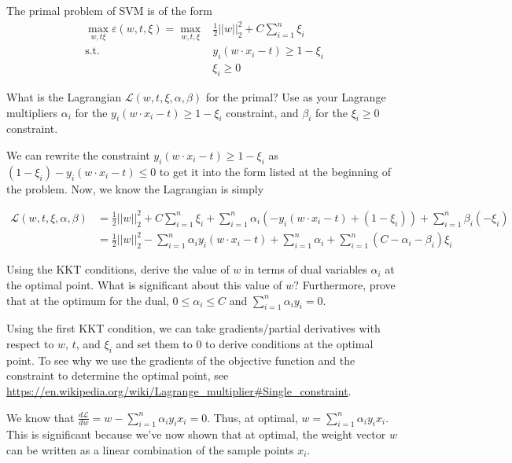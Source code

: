 \begin{Parts}
\Part
The primal problem of SVM is of the form
\begin{align*}
\max_{w, t \xi} \varepsilon(w, t, \xi) = \max_{w, t, \xi} & \frac{1}{2} ||w||_2^2 + C \sum_{i=1}^n \xi_i\\
\text{s.t. } &y_i(w \cdot x_i - t) \geq 1 - \xi_i\\
& \xi_i \geq 0
\end{align*}

What is the Lagrangian $\mathcal{L}(w, t, \xi, \alpha, \beta)$ for the primal? Use as your Lagrange multipliers $\alpha_i$ for the $y_i(w \cdot x_i - t) \geq 1 - \xi_i$ constraint, and $\beta_i$ for the $\xi_i \geq 0$ constraint.

\begin{solution}
We can rewrite the constraint $y_i(w \cdot x_i - t) \geq 1 - \xi_i$ as $(1 - \xi_i) - y_i(w \cdot x_i - t) \leq 0$ to get it into the form listed at the beginning of the problem. Now, we know the Lagrangian is simply

\begin{align*}
\mathcal{L}(w, t, \xi, \alpha, \beta) &= \frac{1}{2} ||w||_2^2 + C \sum_{i=1}^n \xi_i + \sum_{i=1}^n \alpha_i(-y_i(w \cdot x_i - t) + (1 - \xi_i)) + \sum_{i=1}^n \beta_i (-\xi_i) \\
&= \frac{1}{2} ||w||_2^2 - \sum_{i=1}^n \alpha_iy_i(w \cdot x_i - t)  + \sum_{i=1}^n \alpha_i + \sum_{i=1}^n (C - \alpha_i - \beta_i) \xi_i
\end{align*}
\end{solution}

\Part
Using the KKT conditions, derive the value of $w$ in terms of dual variables $\alpha_i$ at the optimal point. What is significant about this value of $w$? Furthermore, prove that at the optimum for the dual, $0 \leq \alpha_i \leq C$ and $\sum_{i=1}^n \alpha_i y_i = 0$.

\begin{solution}
Using the first KKT condition, we can take gradients/partial derivatives with respect to $w$, $t$, and $\xi_i$ and set them to 0 to derive conditions at the optimal point.
To see why we use the gradients of the objective function and the constraint to determine the optimal point, see \url{https://en.wikipedia.org/wiki/Lagrange_multiplier#Single_constraint}.

We know that $\frac{d\mathcal{L}}{dw} = w - \sum_{i=1}^n \alpha_i y_i x_i = 0$. Thus, at optimal, $w = \sum_{i=1}^n \alpha_i y_i x_i$. This is significant because we've now shown that at optimal, the weight vector $w$ can be written as a linear combination of the sample points $x_i$.


\end{solution}
\end{Parts}
